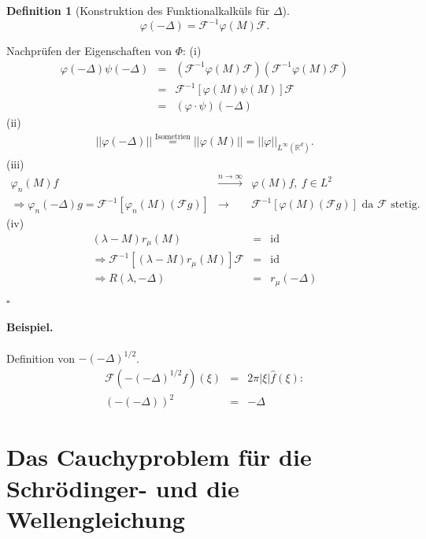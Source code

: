 \documentclass[11pt,a4paper,titlepage, ngerman]{scrartcl}
\newtheorem{Definition}[Satz]{Definition}
\DeclareMathOperator{\id}{id}
\numberwithin{equation}{section}
\newcommand{\R}{\mathbb{R}} %
\newcommand{\f}{\hat{f}}
\newcommand{\F}{\mathcal{F}}
\newcommand{\m}{\cdot}
\newcommand{\laplace}{\Delta}
\newcommand{\qed}{\begin{flushright}
		$\square$
	\end{flushright}}
\begin{document}
	\begin{Definition}[Konstruktion des Funktionalkalküls für $\laplace$]
		$$\varphi(-\laplace) = \F^{-1}\varphi(M)\F.$$
	\end{Definition}
	
	Nachprüfen der Eigenschaften von $\Phi$: (i)
	\begin{eqnarray}
		\varphi(-\laplace)\psi(-\laplace) &=& \left(\F^{-1}\varphi(M)\F \right)\left(\F^{-1}\varphi(M)\F \right)\nonumber\\
		&=&\F^{-1}[\varphi(M)\psi(M)]\F \nonumber\\
		&=& (\varphi\m \psi)(-\laplace)\nonumber
	\end{eqnarray}
	(ii)
	\begin{eqnarray}
		||\varphi(-\laplace)|| \overset{\text{Isometrien}}{=}||\varphi(M)|| =||\varphi||_{L^{\infty}(\R^d)}.\nonumber
	\end{eqnarray}
	(iii) 
	\begin{eqnarray}
		\varphi_n(M)f&\overset{n\rightarrow\infty}{\longrightarrow}&\varphi(M)f,~f\in L^2\nonumber\\
		\Rightarrow \varphi_n(-\laplace)g = \F^{-1}[\varphi_n(M)(\F g)]&\rightarrow &\F^{-1}[\varphi(M)(\F g)] \text{ da }\F\text{ stetig.}\nonumber
	\end{eqnarray}
	(iv)
	\begin{eqnarray}
		(\lambda-M)r_\mu(M)&=& \id\nonumber\\
		\Rightarrow \F^{-1}[(\lambda-M)r_\mu(M)]\F &=&\id\nonumber\\
		\Rightarrow R(\lambda,-\laplace) &=& r_\mu(-\laplace)\nonumber
	\end{eqnarray}
	\qed
	
	\paragraph{Beispiel.} Definition von $-(-\laplace)^{1/2}$.
	\begin{eqnarray}
		\F(-(-\laplace)^{1/2} f)(\xi) &=& 2\pi|\xi|\f(\xi):\nonumber\\
		(-(-\laplace))^2 &=& -\laplace\nonumber
	\end{eqnarray}
	
	\newpage
	
	\section{Das Cauchyproblem für die Schrödinger- und die Wellengleichung}
	
\end{document}
